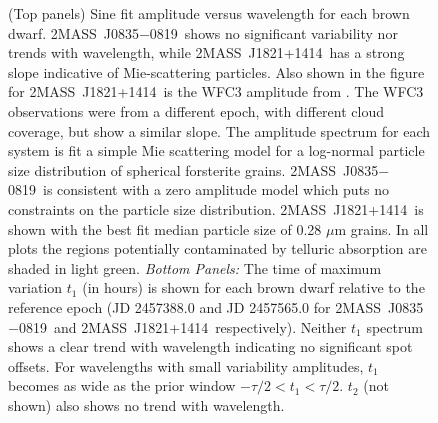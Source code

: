 \documentclass[twocolumn]{aastex6}
\newcommand{\sha}{2MASS~J0835$-$0819}
\newcommand{\shb}{2MASS~J1821+1414}
\begin{document}
\begin{figure}
\centering
{}
	\caption{(Top panels) Sine fit amplitude versus wavelength for each brown dwarf. \sha\ shows no significant variability nor trends with wavelength, while \shb\ has a strong slope indicative of Mie-scattering particles.
	 Also shown in the figure for \shb\ is the WFC3 amplitude from \citet{2015ApJ...798L..13Y}. The WFC3 observations were from a different epoch, with different cloud coverage, but show a similar slope.
	 The amplitude spectrum for each system is fit a simple Mie scattering model for a log-normal particle size distribution of spherical forsterite grains.
	 \sha\ is consistent with a zero amplitude model which puts no constraints on the particle size distribution.
	 \shb\ is shown with the best fit median particle size of 0.28 $\mu$m grains.
	 In all plots the regions potentially contaminated by telluric absorption are shaded in light green.
	 {\it Bottom Panels:} The time of maximum variation $t_1$ (in hours) is shown for each brown dwarf relative to the reference epoch (JD 2457388.0 and JD 2457565.0 for \sha\ and \shb\ respectively).
	 Neither $t_1$ spectrum shows a clear trend with wavelength indicating no significant spot offsets.
	 For wavelengths with small variability amplitudes, $t_1$ becomes as wide as the prior window $-\tau/2 < t_1 < \tau/2$. $t_2$ (not shown) also shows no trend with wavelength.}
	\label{fig:ampSpec}
\end{figure} 
\end{document}
